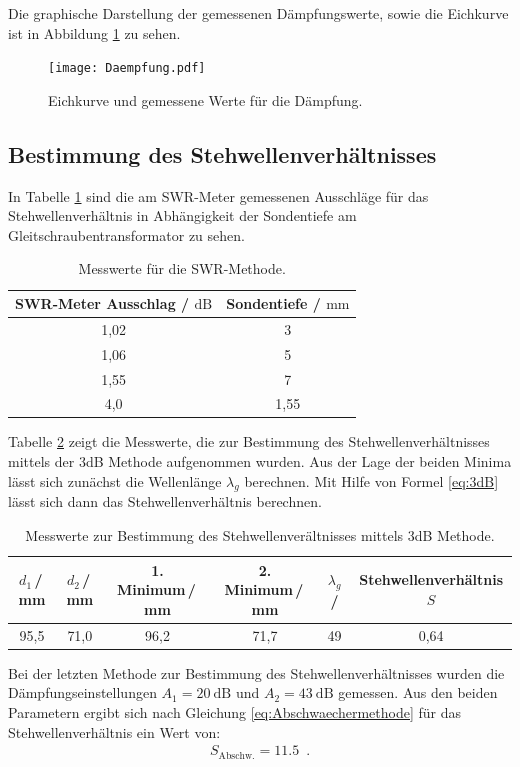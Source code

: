\noindent Die graphische Darstellung der gemessenen Dämpfungswerte, sowie die Eichkurve ist in
Abbildung \ref{fig:Daempfung} zu sehen.
\FloatBarrier
\begin{figure}
    \centering
    \texttt{[image: Daempfung.pdf]}
    \caption{Eichkurve und gemessene Werte für die Dämpfung.}
    \label{fig:Daempfung}
\end{figure}
\FloatBarrier

\subsection{Bestimmung des Stehwellenverhältnisses}
In Tabelle \ref{tab:SWR_Methode} sind die am SWR-Meter gemessenen Ausschläge für
das Stehwellenverhältnis in Abhängigkeit der Sondentiefe am Gleitschraubentransformator
zu sehen.
\FloatBarrier
\begin{table}
    \centering
    \begin{tabular}{c c}
        \toprule
        {SWR-Meter Ausschlag / $\si{\dB}$} & Sondentiefe / $\si{\mm}$ \\
        \midrule
        1,02    &   3       \\
        1,06    &   5       \\
        1,55    &   7       \\
        4,0     &   1,55    \\
        \bottomrule
    \end{tabular}
    \caption{Messwerte für die SWR-Methode.}
    \label{tab:SWR_Methode}
\end{table}
\FloatBarrier
Tabelle \ref{tab:3dB_Methode} zeigt die Messwerte, die zur Bestimmung des Stehwellenverhältnisses
mittels der 3dB Methode aufgenommen wurden. Aus der Lage der beiden Minima lässt sich zunächst
die Wellenlänge $\lambda_{g}$ berechnen. Mit Hilfe von Formel \ref{eq:3dB} lässt sich dann
das Stehwellenverhältnis berechnen.
\FloatBarrier
\begin{table}
    \centering
    \begin{tabular}{c c c c c c}
        \toprule
        {$d_1$\,/\,mm} & {$d_2$\,/\,mm} & {1. Minimum\,/\,mm} & {2. Minimum\,/\,mm} & {$\lambda_g$ / } & {Stehwellenverhältnis $S$}\\
        \midrule
        95,5    &   71,0    &   96,2    &   71,7    &   49    &     0,64 \\
        \bottomrule
    \end{tabular}
    \caption{Messwerte zur Bestimmung des Stehwellenverältnisses mittels 3dB Methode.}
    \label{tab:3dB_Methode}
\end{table}
\FloatBarrier
Bei der letzten Methode zur Bestimmung des Stehwellenverhältnisses wurden die Dämpfungseinstellungen
$A_{1}= \SI{20}{\dB}$ und $A_{2}=\SI{43}{\dB}$ gemessen.
Aus den beiden Parametern ergibt sich nach Gleichung \ref{eq:Abschwaechermethode}
für das Stehwellenverhältnis ein Wert von:
\begin{align*}
    S_{\text{Abschw.}} = \SI{11,5}{} \; .
\end{align*}

